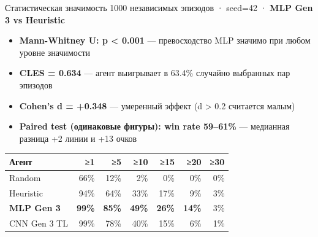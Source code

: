 \documentclass[aspectratio=169]{beamer}
\begin{document}
	\begin{frame}{Статистическая значимость}
		1000 независимых эпизодов · seed=42 · \textbf{MLP Gen 3 vs Heuristic}
		
		\bigskip
		\begin{itemize}
			\item \textbf{Mann-Whitney U: p < 0.001} — превосходство MLP значимо при любом уровне значимости
			\item \textbf{CLES = 0.634} — агент выигрывает в 63.4\% случайно выбранных пар эпизодов
			\item \textbf{Cohen's d = +0.348} — умеренный эффект (d > 0.2 считается малым)
			\item \textbf{Paired test (одинаковые фигуры): win rate 59–61\%} — медианная разница +2 линии и +13 очков
		\end{itemize}
		
		\bigskip
		\begin{tabular}{@{}lrrrrrr@{}}
			\toprule
			\rowcolor{ThemeGridStroke}
			\color{ThemeCellFilled}Агент & \color{ThemeCellFilled}≥1 & \color{ThemeCellFilled}≥5 & \color{ThemeCellFilled}≥10 & \color{ThemeCellFilled}≥15 & \color{ThemeCellFilled}≥20 & \color{ThemeCellFilled}≥30 \\
			\midrule
			Random        & 66\% & 12\% & 2\%  & 0\%  & 0\% & 0\% \\
			Heuristic     & 94\% & 64\% & 33\% & 17\% & 9\% & 3\% \\
			\textbf{MLP Gen 3} & \textbf{99\%} & \textbf{85\%} & \textbf{49\%} & \textbf{26\%} & \textbf{14\%} & 3\% \\
			CNN Gen 3 TL  & 99\% & 78\% & 40\% & 15\% & 6\% & 1\% \\
			\bottomrule
		\end{tabular}
	\end{frame}
	
\end{document}
